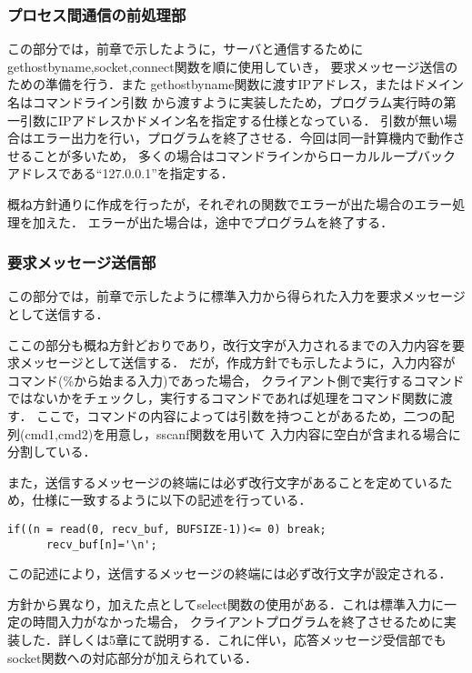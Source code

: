 \documentclass[a4paper,11pt]{jarticle}
\begin{document}
\subsubsection{プロセス間通信の前処理部} 
この部分では，前章で示したように，サーバと通信するためにgethostbyname,socket,connect関数を順に使用していき，
要求メッセージ送信のための準備を行う．また gethostbyname関数に渡すIPアドレス，またはドメイン名はコマンドライン引数
から渡すように実装したため，プログラム実行時の第一引数にIPアドレスかドメイン名を指定する仕様となっている．
引数が無い場合はエラー出力を行い，プログラムを終了させる．今回は同一計算機内で動作させることが多いため，
多くの場合はコマンドラインからローカルループバックアドレスである``127.0.0.1''を指定する．

概ね方針通りに作成を行ったが，それぞれの関数でエラーが出た場合のエラー処理を加えた．
エラーが出た場合は，途中でプログラムを終了する．
\subsubsection{要求メッセージ送信部} 
この部分では，前章で示したように標準入力から得られた入力を要求メッセージとして送信する．

ここの部分も概ね方針どおりであり，改行文字が入力されるまでの入力内容を要求メッセージとして送信する．
だが，作成方針でも示したように，入力内容がコマンド(\%から始まる入力)であった場合，
クライアント側で実行するコマンドではないかをチェックし，実行するコマンドであれば処理をコマンド関数に渡す．
ここで，コマンドの内容によっては引数を持つことがあるため，二つの配列(cmd1,cmd2)を用意し，sscanf関数を用いて
入力内容に空白が含まれる場合に分割している．

また，送信するメッセージの終端には必ず改行文字があることを定めているため，仕様に一致するように以下の記述を行っている．
\begin{verbatim}
if((n = read(0, recv_buf, BUFSIZE-1))<= 0) break;
      recv_buf[n]='\n';
\end{verbatim}
この記述により，送信するメッセージの終端には必ず改行文字が設定される．

方針から異なり，加えた点としてselect関数の使用がある．これは標準入力に一定の時間入力がなかった場合，
クライアントプログラムを終了させるために実装した．詳しくは5章にて説明する．これに伴い，応答メッセージ受信部でも
socket関数への対応部分が加えられている．
\end{document}
